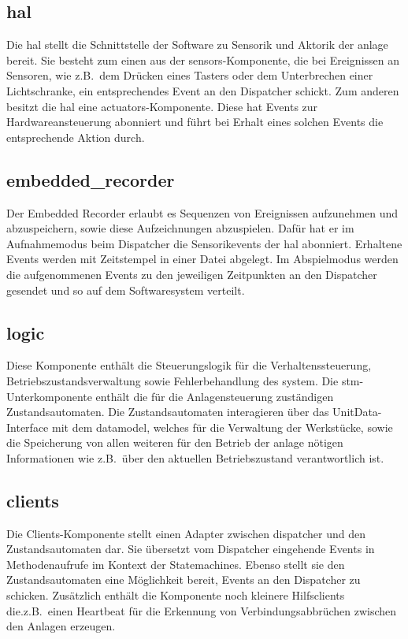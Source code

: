 \subsection{hal}\label{subsec:hal}
Die hal stellt die Schnittstelle der Software zu Sensorik und Aktorik der \gls{anlage} bereit.
Sie besteht zum einen aus der sensors-Komponente, die bei Ereignissen an Sensoren, wie z.B.\
dem Drücken eines Tasters oder dem Unterbrechen einer Lichtschranke,
ein entsprechendes Event an den Dispatcher schickt.
Zum anderen besitzt die hal eine actuators-Komponente.
Diese hat Events zur Hardwareansteuerung abonniert und führt bei Erhalt eines solchen Events die entsprechende Aktion durch.

\subsection{embedded\_recorder}\label{subsec:embedded_recorder}
Der Embedded Recorder erlaubt es Sequenzen von Ereignissen aufzunehmen und abzuspeichern, sowie diese Aufzeichnungen abzuspielen.
Dafür hat er im Aufnahmemodus beim Dispatcher die Sensorikevents der hal abonniert.
Erhaltene Events werden mit Zeitstempel in einer Datei abgelegt.
Im Abspielmodus werden die aufgenommenen Events zu den jeweiligen Zeitpunkten an den Dispatcher gesendet und so auf dem Softwaresystem verteilt.

\subsection{logic}\label{subsec:logic}
Diese Komponente enthält die Steuerungslogik für die Verhaltenssteuerung, Betriebszustandsverwaltung sowie Fehlerbehandlung des \gls{system}.
Die stm-Unterkomponente enthält die für die Anlagensteuerung zuständigen Zustandsautomaten. Die Zustandsautomaten interagieren über das
UnitData-Interface mit dem datamodel, welches für die Verwaltung der Werkstücke, sowie die Speicherung von allen weiteren für den Betrieb der \gls{anlage} nötigen
Informationen wie z.B.\ über den aktuellen Betriebszustand verantwortlich ist.

\subsection{clients}\label{subsec:clients}
Die Clients-Komponente stellt einen Adapter zwischen dispatcher und den Zustandsautomaten dar.
Sie übersetzt vom Dispatcher eingehende Events in Methodenaufrufe im Kontext der Statemachines.
Ebenso stellt sie den Zustandsautomaten eine Möglichkeit bereit, Events an den Dispatcher zu schicken.
Zusätzlich enthält die Komponente noch kleinere Hilfsclients die.z.B.\ einen Heartbeat für die Erkennung
von Verbindungsabbrüchen zwischen den Anlagen erzeugen.

